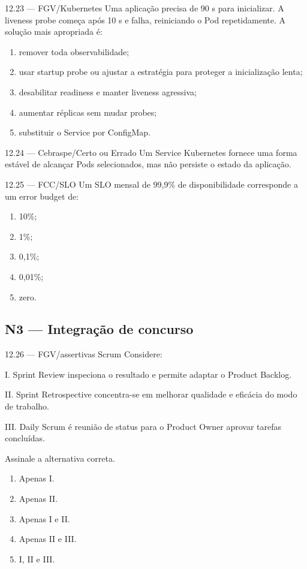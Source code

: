 \begin{questao}{ 12.23 — FGV/Kubernetes}
Uma aplicação precisa de 90 s para inicializar. A liveness probe começa após 10 s e falha, reiniciando o Pod repetidamente. A solução mais apropriada é:
\begin{enumerate}[label=\Alph*)]
\item remover toda observabilidade;
\item usar startup probe ou ajustar a estratégia para proteger a inicialização lenta;
\item desabilitar readiness e manter liveness agressiva;
\item aumentar réplicas sem mudar probes;
\item substituir o Service por ConfigMap.
\end{enumerate}
\end{questao}

\begin{questao}{ 12.24 — Cebraspe/Certo ou Errado}
Um Service Kubernetes fornece uma forma estável de alcançar Pods selecionados, mas não persiste o estado da aplicação.
\end{questao}

\begin{questao}{ 12.25 — FCC/SLO}
Um SLO mensal de 99,9\% de disponibilidade corresponde a um error budget de:
\begin{enumerate}[label=\Alph*)]
\item 10\%;
\item 1\%;
\item 0,1\%;
\item 0,01\%;
\item zero.
\end{enumerate}
\end{questao}

\subsection*{N3 — Integração de concurso}

\begin{questao}{ 12.26 — FGV/assertivas Scrum}
Considere:

I. Sprint Review inspeciona o resultado e permite adaptar o Product Backlog.

II. Sprint Retrospective concentra-se em melhorar qualidade e eficácia do modo de trabalho.

III. Daily Scrum é reunião de status para o Product Owner aprovar tarefas concluídas.

Assinale a alternativa correta.
\begin{enumerate}[label=\Alph*)]
\item Apenas I.
\item Apenas II.
\item Apenas I e II.
\item Apenas II e III.
\item I, II e III.
\end{enumerate}
\end{questao}

